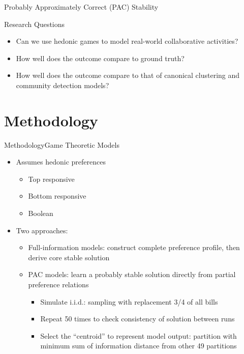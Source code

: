 \documentclass[xcolor=dvipsnames]{beamer}
\begin{document}
\begin{frame}{Probably Approximately Correct (PAC) Stability}
\end{frame}

\begin{frame}{Research Questions}
  \begin{itemize}
    \item Can we use hedonic games to model real-world collaborative activities?
    \item How well does the outcome compare to ground truth?
    \item How well does the outcome compare to that of canonical clustering and community detection models?
  \end{itemize}
\end{frame}

\section{Methodology}

\begin{frame}{Methodology}{Game Theoretic Models}
  \begin{itemize}
    \item Assumes hedonic preferences
    \begin{itemize}
      \item Top responsive
      \item Bottom responsive
      \item Boolean
    \end{itemize}
    \item<2-> Two approaches:
    \begin{itemize}
      \item Full-information models: construct complete preference profile, then derive core stable solution
      \item PAC models: learn a probably stable solution directly from partial preference relations
      \begin{itemize}
        \item<3-> Simulate i.i.d.: sampling with replacement 3/4 of all bills
        \item<3-> Repeat 50 times to check consistency of solution between runs
        \item<3-> Select the ``centroid'' to represent model output: partition with minimum sum of information distance from other 49 partitions
      \end{itemize}
    \end{itemize}
  \end{itemize}
\end{frame}
\end{document}
